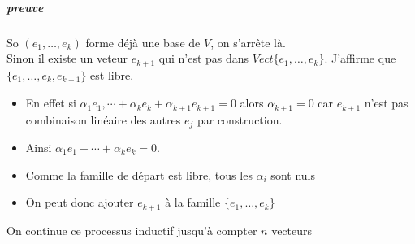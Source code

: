 \subparagraph{preuve} So $(e_1, \dots, e_k)$ forme déjà une base de $V$, on s'arrête là.\\
Sinon il existe un veteur $e_{k+1}$ qui n'est pas dans $Vect\{e_1, \dots, e_k\}$. J'affirme que $\{e_1, \dots, e_k, e_{k+1}\}$ est libre.
\\
\begin{itemize}
    \item En effet si $\alpha_1e_1, \cdots + \alpha_ke_k + \alpha_{k+1}e_{k+1} = 0$ alors $\alpha_{k+1} = 0$ car $e_{k+1}$ n'est pas combinaison linéaire des autres $e_j$ par construction.
    \item Ainsi $\alpha_1e_1 + \cdots + \alpha_ke_k  = 0$.
    \item Comme la famille de départ est libre, tous les $\alpha_i$ sont nuls
    \item On peut donc ajouter $e_{k+1}$ à la famille $\{e_1, \dots, e_k\}$
\end{itemize}
On continue ce processus inductif jusqu'à compter $n$ vecteurs


